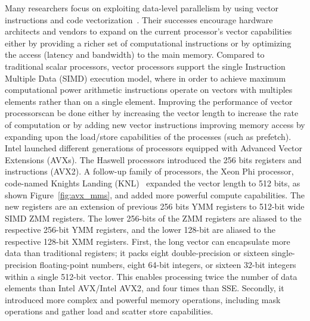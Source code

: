 \documentclass[conference]{IEEEtran}
\begin{document}
%
Many researchers focus on exploiting data-level parallelism by using vector instructions
and code vectorization~\cite{Vectorizing-Compilers, VectorArchitectures}. Their successes
encourage hardware architects and vendors to expand on the current processor's
vector capabilities either by providing a richer set of computational
instructions or by optimizing the access (latency and bandwidth) to the main
memory.
%
Compared to traditional scalar processors, vector processors support
the single Instruction Multiple Data (SIMD) execution model, where in order to
achieve maximum computational power arithmetic instructions operate on vectors
with multiples elements rather than on a single element.
%
Improving the performance of vector processorscan be done either by  increasing
the vector length to increase the rate of computation or by adding new vector
instructions improving memory access by expanding upon the load/store
capabilities of the processes (such as prefetch).
Intel launched different generations of processors equipped with Advanced Vector
Extensions (AVXs). The Haswell processors introduced the 256 bits registers and
instructions (AVX2). A follow-up family of processors, the Xeon Phi processor,
code-named Knights Landing (KNL)~\cite{avx-info, Intelref} expanded the vector
length to 512 bits, as shown Figure~\ref{fig:avx_mms}, and added more powerful
compute capabilities. The new registers are an extension of previous 256 bits
YMM registers to 512-bit wide SIMD ZMM registers. The lower 256-bits of the ZMM
registers are aliased to the respective 256-bit YMM registers, and the lower
128-bit are aliased to the respective 128-bit XMM registers. First, the long
vector can encapsulate more data than traditional registers; it packs eight
double-precision or sixteen single-precision floating-point numbers, eight
64-bit integers, or sixteen 32-bit integers within a single 512-bit vector. This
enables processing twice the number of data elements than Intel AVX/Intel AVX2,
and four times than SSE. Secondly, it introduced more complex and powerful
memory operations, including mask operations and gather load and scatter store
capabilities.
\end{document}
